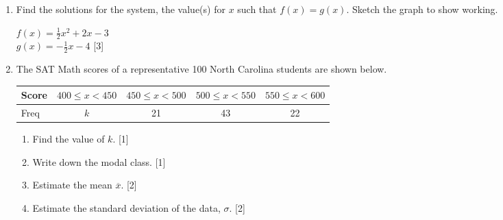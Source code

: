 \documentclass[12pt, twoside]{article}
\begin{document}
\begin{enumerate}
  \newpage
    \item Find the solutions for the system, the value(s) for $x$ such that $f(x)=g(x)$. Sketch the graph to show working.
    \begin{multicols}{2}
        \qquad $f(x)=\frac{1}{2}x^2+2x-3$ \\[0.25cm] $g(x)=-\frac{1}{2}x-4$ \hfill [3] \vspace{0.3cm}
    \end{multicols}

    \item The SAT Math scores of a representative 100 North Carolina students are shown below.
        \begin{center}
            \begin{tabular}{|l|c|c|c|c|}
                \hline
                Score & $400 \leq x < 450$ & $450 \leq x < 500$ & $500 \leq x < 550$ & $550 \leq x < 600$\\ 
                \hline 
                Freq & $k$ & 21 & 43 & 22\\ 
                \hline 
                \end{tabular}
        \end{center}
        \begin{enumerate}
            \item Find the value of $k$.  \hfill [1]
            \item Write down the modal class. \hfill [1]
            \item Estimate the mean $\overline{x}$. \hfill [2]
            \item Estimate the standard deviation of the data, $\sigma$.  \hfill [2]
            \end{enumerate}

        
                   
\end{enumerate}
\end{document}
